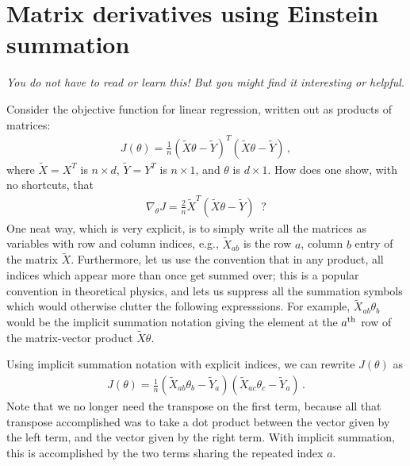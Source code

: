 \section{Matrix derivatives using Einstein summation}
\label{app:einstein}

{\em You do not have to read or learn this!  But you might find it
  interesting or helpful.}

\def\bea{\begin{eqnarray}}
    \def\eea{\end{eqnarray}}
\def\Xt{\tilde{X}}
\def\Yt{\tilde{Y}}

Consider the objective function for linear regression, written out as products of matrices:
\bea
J(\theta) = \frac{1}{n} (\Xt\theta - \Yt)^T (\Xt\theta-\Yt)
\,,
\eea
where $\Xt = X^T$ is $n\times d$, $\Yt=Y^T$ is $n\times 1$, and $\theta$ is $d\times 1$.  How does one show, with no shortcuts, that
\bea
\nabla_{\theta}J = \frac{2}{n} {\Xt^T} {(\Xt\theta - \Yt)} \;\;?
\eea
One neat way, which is very explicit, is to simply write all the
matrices as variables with row and column indices, e.g., $\Xt_{ab}$ is
the row $a$, column $b$ entry of the matrix $\Xt$.  Furthermore, let
us use the convention that in any product, all indices which appear
more than once get summed over; this is a popular convention in
theoretical physics, and lets us suppress all the summation symbols
which would otherwise clutter the following expresssions.  For
example, $\Xt_{ab} \theta_b$ would be the implicit summation notation
giving the element at the $a^{\rm th}$ row of the matrix-vector
product $\Xt \theta$.

Using implicit summation notation with explicit indices,
we can rewrite $J(\theta)$ as
\bea
J(\theta) = \frac{1}{n} \left( \Xt_{ab} \theta_b - \Yt_a \right)  \left( \Xt_{ac}\theta_c - \Yt_a \right) \,.
\eea
Note that we no longer need the transpose on the first term, because
all that transpose accomplished was to take a dot product between the
vector given by the left term, and the vector given by the right term.
With implicit summation, this is accomplished by the two terms sharing
the repeated index $a$.

